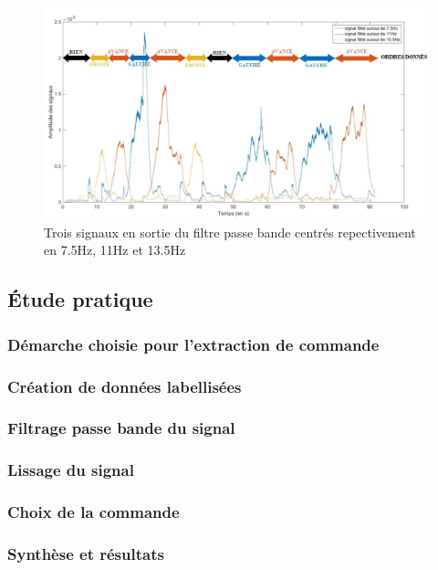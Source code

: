 \documentclass[11pt]{article}
\begin{document}
\begin{figure}[!h]
	\includegraphics[scale=0.75]{images/puissancelissee.jpg}
	\caption{Trois signaux en sortie du filtre passe bande centrés repectivement en 7.5Hz, 11Hz et 13.5Hz}
	\label{fig:duck}
\end{figure}





\cleardoublepage
\subsection{Étude pratique}
\subsubsection{Démarche choisie pour l'extraction de commande}
\subsubsection{Création de données labellisées}
\subsubsection{Filtrage passe bande du signal}
\subsubsection{Lissage du signal}
\subsubsection{Choix de la commande}
\subsubsection{Synthèse et résultats}

\cleardoublepage
\end{document}
